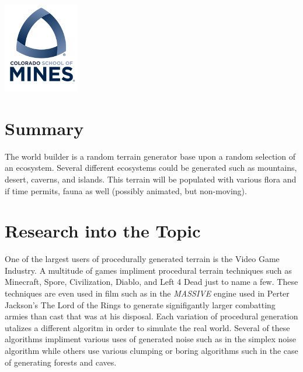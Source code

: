 \documentclass[12pt]{article}
\begin{document}
\begin{titlepage}
\newcommand*{\plogo}{\includegraphics[width=0.25\textwidth]{imgs/mines.png}}

\plogo\\[1cm] %
 

\vfill %
\end{titlepage}

\newpage
\tableofcontents
\newpage

\section{Summary}
The world builder is a random terrain generator base upon a random selection of an ecosystem. 
Several different ecosystems could be generated such as mountains, desert, caverns, and islands.
This terrain will be populated with various flora and if time permits, fauna as well (possibly animated, but non-moving). 

\section{Research into the Topic}
One of the largest users of procedurally generated terrain is the Video Game Industry.
A multitude of games impliment procedural terrain techniques such as Minecraft, Spore, Civilization, 
Diablo, and Left 4 Dead just to name a few. These techniques are even used in film such as in the \textit{MASSIVE} 
engine used in Perter Jackson's The Lord of the Rings to generate signifigantly larger combatting armies than 
cast that was at his disposal. Each variation of procedural generation utalizes a different algoritm in order to 
simulate the real world. Several of these algorithms impliment various uses of generated noise such as in the 
simplex noise algorithm while others use various clumping or boring algorithms such in the case of generating 
forests and caves.
\end{document}
